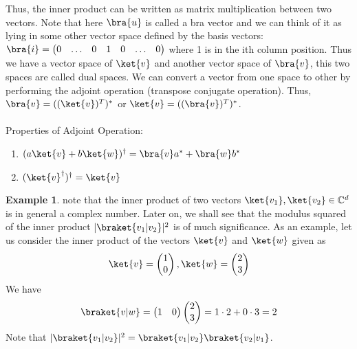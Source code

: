 \documentclass[12pt, oneside]{book}
\theoremstyle{definition}
\theoremstyle{definition}
\newtheorem{example}{Example}[section]
\theoremstyle{remark}
\begin{document}
Thus, the inner product can be written as matrix multiplication between two vectors. 
Note that here $\bra{u}$ is called a bra vector and we can think of it as lying in some other vector space defined by the basis vectors:
$\bra{i}=\begin{pmatrix} 0 & \ldots & 0 & 1 & 0 & \ldots & 0 \end{pmatrix}$ where 1 is in the ith column position. Thus we have a vector space of $\ket{v}$ and another vector space
of $\bra{v}$, this two spaces are called dual spaces. We can convert a vector from one space to other by performing the adjoint operation (transpose conjugate operation). Thus, $\bra{v}=((\ket{v})^{T})^{*}$ or $\ket{v}=((\bra{v})^{T})^{*}$. \\
\\
Properties of Adjoint Operation:
\begin{enumerate}
    \item $(a\ket{v}+b\ket{w})^{\dagger}=\bra{v}a^{*}+\bra{w}b^{*}$
    \item $(\ket{v}^{\dagger})^{\dagger}=\ket{v}$
\end{enumerate}

\begin{example}
    note that the inner product of two vectors $\ket{v_1},\ket{v_2} \in \mathbb{C}^d$ is in general a complex number. Later on, we shall see that the modulus squared of the inner product $|\braket{v_1|v_2}|^2$ is of much significance. As an example, let us consider the inner product of the vectors $\ket{v}$ and $\ket{w}$ given as
    \[
    \ket{v}=\begin{pmatrix} 1 \\0 \end{pmatrix},\ket{w}=\begin{pmatrix} 2 \\ 3 \end{pmatrix}
    \]
    We have
    \[
    \braket{v|w}=\begin{pmatrix} 1 & 0 \end{pmatrix} \begin{pmatrix}2 \\3 \end{pmatrix}=1\cdot 2+0\cdot 3 =2
    \]
    Note that $|\braket{v_1|v_2}|^2=\braket{v_1|v_2}\braket{v_2|v_1}$.
\end{example}
\end{document}
